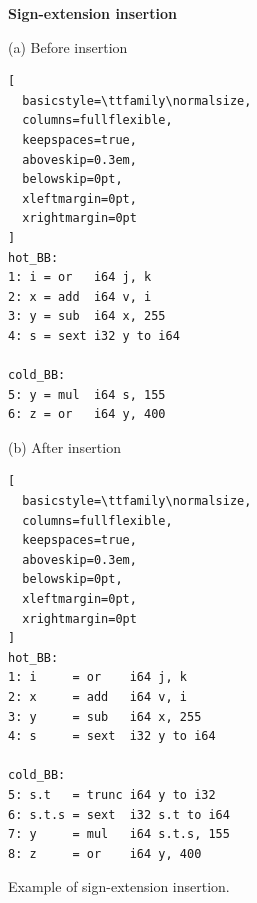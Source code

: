\begin{figure}[H]
\centering

\begin{minipage}{0.88\textwidth}
\raggedright

\textbf{Sign-extension insertion}

\medskip

\noindent
\begin{minipage}[t]{0.43\linewidth}
\textnormal{(a) Before insertion}

\begin{lstlisting}[
  basicstyle=\ttfamily\normalsize,
  columns=fullflexible,
  keepspaces=true,
  aboveskip=0.3em,
  belowskip=0pt,
  xleftmargin=0pt,
  xrightmargin=0pt
]
hot_BB:
1: i = or   i64 j, k
2: x = add  i64 v, i
3: y = sub  i64 x, 255
4: s = sext i32 y to i64

cold_BB:
5: y = mul  i64 s, 155
6: z = or   i64 y, 400
\end{lstlisting}
\end{minipage}%
\hfill
\begin{minipage}[t]{0.53\linewidth}
\textnormal{(b) After insertion}

\begin{lstlisting}[
  basicstyle=\ttfamily\normalsize,
  columns=fullflexible,
  keepspaces=true,
  aboveskip=0.3em,
  belowskip=0pt,
  xleftmargin=0pt,
  xrightmargin=0pt
]
hot_BB:
1: i     = or    i64 j, k
2: x     = add   i64 v, i
3: y     = sub   i64 x, 255
4: s     = sext  i32 y to i64

cold_BB:
5: s.t   = trunc i64 y to i32
6: s.t.s = sext  i32 s.t to i64
7: y     = mul   i64 s.t.s, 155
8: z     = or    i64 y, 400
\end{lstlisting}
\end{minipage}

\end{minipage}

\captionsetup{
  font=small,
  justification=centering,
  singlelinecheck=false,
  skip=0pt
}
\vspace{1.2em}
\caption{Example of sign-extension insertion.}
\label{fig:figure4}

\end{figure}